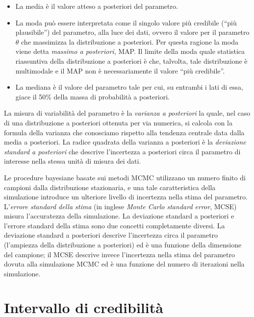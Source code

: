 \documentclass[
  11pt,
  italian,
  a4paper,
  extrafontsizes,onecolumn,openright
  ]{memoir}
\providecommand{\tightlist}{%
  \setlength{\itemsep}{0pt}\setlength{\parskip}{0pt}}
\begin{document}
\begin{itemize}
\tightlist
\item
  La media è il valore atteso a posteriori del parametro.
\item
  La moda può essere interpretata come il singolo valore più credibile (``più plausibile'') del parametro, alla luce dei dati, ovvero il valore per il parametro \(\theta\) che massimizza la distribuzione a posteriori. Per questa ragione la moda viene detta \emph{massimo a posteriori}, MAP. Il limite della moda quale statistica riassuntiva della distribuzione a posteriori è che, talvolta, tale distribuzione è multimodale e il MAP non è necessariamente il valore ``più credibile''.
\item
  La mediana è il valore del parametro tale per cui, su entrambi i lati di essa, giace il 50\% della massa di probabilità a posteriori.
\end{itemize}

La misura di variabilità del parametro è la \emph{varianza a posteriori}
la quale, nel caso di una distribuzione a posteriori ottenuta per via
numerica, si calcola con la formula della varianza che conosciamo
rispetto alla tendenza centrale data dalla media a posteriori. La radice quadrata della varianza a posteriori è la \emph{deviazione standard a posteriori} che descrive l'incertezza a posteriori circa il parametro di interesse nella stessa unità di misura dei dati.

Le procedure bayesiane basate sui metodi MCMC utilizzano un numero finito di campioni dalla distribuzione stazionaria, e una tale caratteristica della simulazione introduce un ulteriore livello di incertezza nella stima del parametro. L'\emph{errore standard della stima} (in inglese \emph{Monte Carlo standard error}, MCSE) misura l'accuratezza della simulazione. La deviazione standard a posteriori e l'errore standard della stima sono due concetti completamente diversi. La deviazione standard a posteriori descrive l'incertezza circa il parametro (l'ampiezza della distribuzione a posteriori) ed è una funzione della dimensione del campione; il MCSE descrive invece l'incertezza nella stima del parametro dovuta alla simulazione MCMC ed è una funzione del numero di iterazioni nella simulazione.

\hypertarget{intervallo-di-credibilituxe0}{%
\section{Intervallo di credibilità}\label{intervallo-di-credibilituxe0}}
\end{document}
